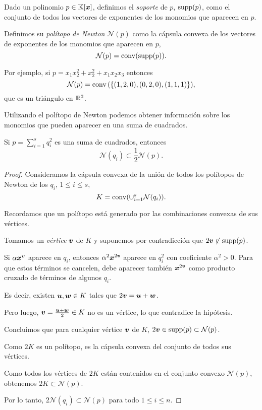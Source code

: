 \begin{definition}
Dado un polinomio $p \in \mathbb{K}[\bm{x}]$, definimos el \emph{soporte} de $p$, $\operatorname{supp}(p)$, como el conjunto de todos los vectores de exponentes de los monomios que aparecen en $p$.

Definimos  su \emph{polítopo de Newton} $\mathcal{N}(p)$ como la cápsula convexa de los vectores de exponentes de los monomios que aparecen en $p$,
$$
\mathcal{N}(p) = \operatorname{conv}(\operatorname{supp}(p)).
$$
\end{definition}

Por ejemplo, si $p = x_1 x_2^2 + x_2^2 + x_1 x_2 x_3$ entonces
$$
\mathcal{N}(p) = \operatorname{conv}{(\{(1,2,0), (0,2,0), (1,1,1)\})},
$$
que es un triángulo en $\mathbb{R}^3$.

Utilizando el polítopo de Newton podemos obtener información sobre los monomios que pueden aparecer en una suma de cuadrados.

\begin{theorem}
Si $p = \sum_{i = 1}^s q_i^2$ es una suma de cuadrados, entonces
$$
\mathcal{N}(q_i) \subset \frac{1}{2}\mathcal{N}(p).
$$
\end{theorem}

\begin{proof}
Consideramos la cápsula convexa de la unión de todos los polítopos de Newton de los $q_i$, $1 \le i \le s$,
$$
K = \operatorname{conv}(\cup_{i=1}^s\mathcal{N}(q_i)).
$$

Recordamos que un polítopo está generado por las combinaciones convexas de sus vértices.

Tomamos un \emph{vértice} $\bm{v}$ de $K$ y suponemos por contradicción que $2\bm{v} \not\in \operatorname{supp}(p)$.

Si $\alpha \bm{x}^{\bm{v}}$ aparece en $q_i$, entonces $\alpha^2 \bm{x}^{2\bm{v}}$ aparece en $q_i^2$ con coeficiente $\alpha^2 > 0$. Para que estos términos se cancelen, debe aparecer también $\bm{x}^{2\bm{v}}$ como producto cruzado de términos de algunos $q_i$.

Es decir, existen $\bm{u}, \bm{w} \in K$ tales que $2\bm{v} = \bm{u}+\bm{w}$.

Pero luego, $\bm{v} = \frac{\bm{u}+\bm{w}}{2} \in K$ no es un vértice, lo que contradice la hipótesis.

Concluimos que para cualquier vértice $\bm{v}$ de $K$, $2\bm{v} \in \operatorname{supp}(p) \subset \mathcal{N}(p)$.

Como $2K$ es un polítopo, es la cápsula convexa del conjunto de todos sus vértices.

Como todos los vértices de $2K$ están contenidos en el conjunto convexo $\mathcal{N}(p)$, obtenemos $2K \subset \mathcal{N}(p)$.

Por lo tanto, $2 \mathcal{N}(q_i) \subset \mathcal{N}(p)$ para todo $1 \le i \le n$.

\end{proof}

